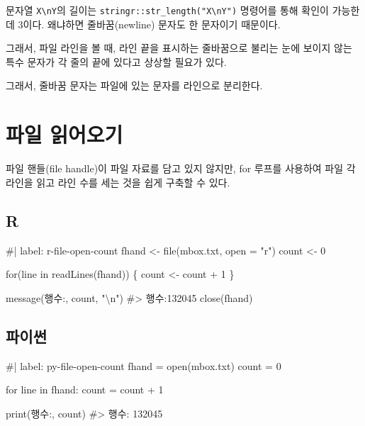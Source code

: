 \documentclass[
  letterpaper,
]{book}
\newenvironment{Shaded}{\begin{snugshade}}{\end{snugshade}}
\newcommand{\NormalTok}[1]{\textcolor[rgb]{0.00,0.23,0.31}{#1}}
\begin{document}
문자열 \texttt{X\textbackslash{}nY}의 길이는
\texttt{stringr::str\_length("X\textbackslash{}nY")} 명령어를 통해
확인이 가능한데 3이다. 왜냐하면 줄바꿈(newline) 문자도 한 문자이기
때문이다.

그래서, 파일 라인을 볼 때, 라인 끝을 표시하는 줄바꿈으로 불리는 눈에
보이지 않는 특수 문자가 각 줄의 끝에 있다고 상상할 필요가 있다.

그래서, 줄바꿈 문자는 파일에 있는 문자를 라인으로 분리한다.

\section{파일 읽어오기}\label{r-file-open-handler}

 

파일 핸들(file handle)이 파일 자료를 담고 있지 않지만, for 루프를
사용하여 파일 각 라인을 읽고 라인 수를 세는 것을 쉽게 구축할 수 있다.

\subsection{R}

\begin{Shaded}
\begin{Highlighting}[]
\NormalTok{\#| label: r{-}file{-}open{-}count}
\NormalTok{fhand \textless{}{-} file(\textquotesingle{}mbox.txt\textquotesingle{}, open = "r")}
\NormalTok{count \textless{}{-} 0}

\NormalTok{for(line in readLines(fhand)) \{}
\NormalTok{  count \textless{}{-} count + 1}
\NormalTok{\}}

\NormalTok{message(\textquotesingle{}행수:\textquotesingle{}, count, "\textbackslash{}n")}
\NormalTok{\#\textgreater{} 행수:132045}
\NormalTok{close(fhand)}
\end{Highlighting}
\end{Shaded}

\subsection{파이썬}

\begin{Shaded}
\begin{Highlighting}[]
\NormalTok{\#| label: py{-}file{-}open{-}count}
\NormalTok{fhand = open(\textquotesingle{}mbox.txt\textquotesingle{})}
\NormalTok{count = 0}

\NormalTok{for line in fhand:}
\NormalTok{    count = count + 1}

\NormalTok{print(\textquotesingle{}행수:\textquotesingle{}, count)}
\NormalTok{\#\textgreater{} 행수: 132045}
\end{Highlighting}
\end{Shaded}
\end{document}
